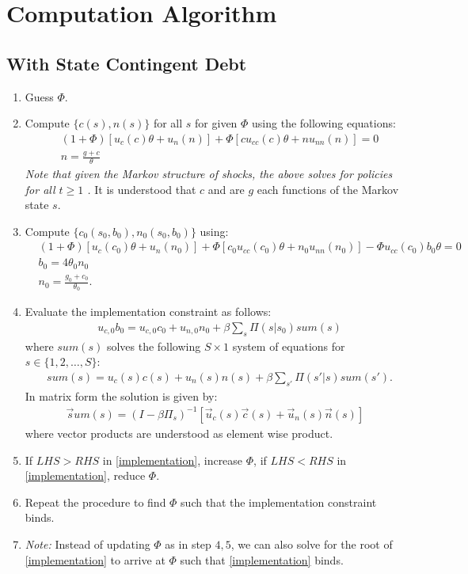 \documentclass[12pt]{article}
\begin{document}
\section{Computation Algorithm}
\subsection{With State Contingent Debt}
\begin{enumerate}
\item Guess $\Phi$.
\item Compute $\{c(s), n(s) \}$ for all $s$ for given $\Phi$ using the following equations:
\begin{align*}
& (1+\Phi)[u_c(c)\theta + u_n(n)] + \Phi[cu_{cc}(c)\theta + nu_{nn}(n)] =0 \\
& n = \frac{g + c}{\theta}
\end{align*}
\textit{Note that given the Markov structure of shocks, the above solves for policies for all $t\geq 1$ .} It is understood that $c$ and  are $g$ each functions of the Markov state $s$.
\item Compute $\{c_0(s_0, b_0), n_0(s_0, b_0) \}$  using:
\begin{align*}
& (1+\Phi) [u_c(c_0)\theta + u_n(n_0)] + \Phi[c_0 u_{cc}(c_0)\theta + n_0 u_{nn}(n_0)] - \Phi u_{cc}(c_0) b_0 \theta = 0 \\
& b_0 = 4 \theta_0 n_0 \\
& n_0 = \frac{g_0 + c_0}{\theta_0}.
\end{align*}
\item Evaluate the implementation constraint as follows:
\begin{align}\label{implementation}
& u_{c,0} b_0 = u_{c,0} c_0 + u_{n,0} n_0  + \beta \sum_{s} \Pi(s | s_0) sum(s)
\end{align}
where $sum(s)$ solves the following $S \times 1$ system of equations for $s \in \{1, 2, \dots, S \}$:
\begin{align*}
& sum(s) = u_{c}(s) c(s) + u_{n}(s) n(s)  + \beta \sum_{s'} \Pi(s' | s) sum(s').
\end{align*}
In matrix form the solution is given by:
\begin{align*}
\vec sum(s) = (I - \beta \Pi_s)^{-1}[\vec u_{c}(s) \vec c(s) + \vec u_{n}(s) \vec n(s)]
\end{align*}
where vector products are understood as element wise product.

\item If $LHS > RHS$ in \ref{implementation}, increase $\Phi$, if $LHS < RHS$ in \ref{implementation}, reduce $\Phi$.
\item Repeat the procedure to find $\Phi$ such that the implementation constraint binds.
\item \textit{Note:} Instead of updating $\Phi$ as in step $4, 5$, we can also solve for the root of \ref{implementation} to arrive at $\Phi$ such that \ref{implementation} binds.
\end{enumerate}
\end{document}
